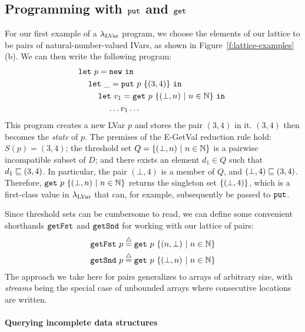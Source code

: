 \subsection{Programming with $\mbox{\texttt{put}}$ and $\mbox{\texttt{get}}$}\label{subsection:lvars-programming-with-put-and-get}
For our first example of a $\lambda_{\textrm{LVar}}$ program, we choose the
elements of our lattice to be pairs of natural-number-valued IVars, as
shown in Figure~\ref{f:lattice-examples}(b).  We can then write the
following program:
\begin{equation}
\begin{split}
& \letexp{p}{\NEW}{ \\
& \letspace \letexp{\_}{\putexp{p}{\stateset{(3,4)}}}{ \\
& \letspace \letspace \letexp{v_1}{\getexp{p}{\stateset{(\bot, n) \setsep n \in \mathbb{N}}}}{ \\
& \letspace \letspace \letspace \dots v_1 \dots}}}
\end{split}
\label{e:getSnd}
\end{equation}
This program creates a new LVar $p$ and stores the pair $(3, 4)$ in
it.  $(3,4)$ then becomes the \emph{state} of $p$.  The premises of
the {\sc E-GetVal} reduction rule hold: $S(p) = (3,4)$; the threshold
set $Q = \lbrace (\bot, n) \ | \  n \in \mathbb{N} \rbrace$ is a pairwise
incompatible subset of $D$; and there exists an element $d_1 \in Q$
such that $d_1 \sqsubseteq (3,4)$.  In particular, the pair $(\bot, 4)$
is a member of $Q$, and $(\bot,4) \sqsubseteq (3,4)$.  Therefore,
$\mbox{\texttt{get}}~p~\lbrace (\bot, n) \ | \  n \in \mathbb{N} \rbrace$ returns
the singleton set $\lbrace (\bot,4) \rbrace$, {which is a first-class value
  in $\lambda_{\textrm{LVar}}$ that can, for example, subsequently be passed to
  $\mbox{\texttt{put}}$.}

Since threshold sets can be cumbersome to read, we can define some
convenient shorthands $\mbox{\texttt{getFst}}$ and $\mbox{\texttt{getSnd}}$ for working with our
lattice of pairs:
\begin{align*}
\mbox{\texttt{getFst}}~p \stackrel{\triangle}{=} \mbox{\texttt{get}}~p~\lbrace (n, \bot) \ | \  n \in
    \mathbb{N} \rbrace \\
\mbox{\texttt{getSnd}}~p \stackrel{\triangle}{=} \mbox{\texttt{get}}~p~\lbrace (\bot, n) \ | \  n \in
    \mathbb{N} \rbrace
\end{align*}
The approach we take here for pairs generalizes to arrays of arbitrary
size, with \emph{streams} being the special case of unbounded arrays
where consecutive locations are written.

\paragraph{Querying incomplete data structures}

